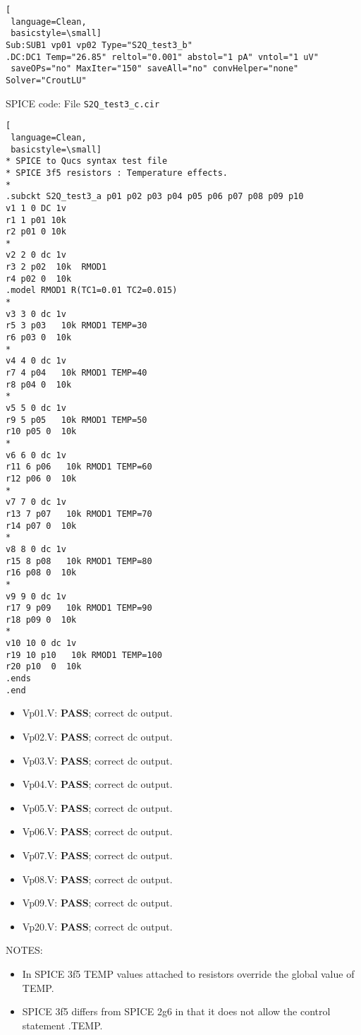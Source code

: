 \begin{flushleft}
\begin{flushleft}
\begin{lstlisting}[
 language=Clean, 
 basicstyle=\small]
Sub:SUB1 vp01 vp02 Type="S2Q_test3_b"
.DC:DC1 Temp="26.85" reltol="0.001" abstol="1 pA" vntol="1 uV"
 saveOPs="no" MaxIter="150" saveAll="no" convHelper="none" Solver="CroutLU"

\end{lstlisting}
\end{flushleft}



SPICE code: File \verb|S2Q_test3_c.cir|
\begin{lstlisting}[
 language=Clean, 
 basicstyle=\small]
* SPICE to Qucs syntax test file 
* SPICE 3f5 resistors : Temperature effects.
*
.subckt S2Q_test3_a p01 p02 p03 p04 p05 p06 p07 p08 p09 p10
v1 1 0 DC 1v
r1 1 p01 10k
r2 p01 0 10k
*
v2 2 0 dc 1v
r3 2 p02  10k  RMOD1 
r4 p02 0  10k
.model RMOD1 R(TC1=0.01 TC2=0.015)
*
v3 3 0 dc 1v
r5 3 p03   10k RMOD1 TEMP=30
r6 p03 0  10k
*
v4 4 0 dc 1v
r7 4 p04   10k RMOD1 TEMP=40
r8 p04 0  10k
*
v5 5 0 dc 1v
r9 5 p05   10k RMOD1 TEMP=50
r10 p05 0  10k
*
v6 6 0 dc 1v
r11 6 p06   10k RMOD1 TEMP=60
r12 p06 0  10k
*
v7 7 0 dc 1v
r13 7 p07   10k RMOD1 TEMP=70
r14 p07 0  10k
*
v8 8 0 dc 1v
r15 8 p08   10k RMOD1 TEMP=80
r16 p08 0  10k
*
v9 9 0 dc 1v
r17 9 p09   10k RMOD1 TEMP=90
r18 p09 0  10k
*
v10 10 0 dc 1v
r19 10 p10   10k RMOD1 TEMP=100
r20 p10  0  10k
.ends
.end

\end{lstlisting}
\end{flushleft}

\begin{flushleft}

\begin{itemize}
 \item Vp01.V: \textbf{PASS}; correct dc output.
 \item Vp02.V: \textbf{PASS}; correct dc output.
 \item Vp03.V: \textbf{PASS}; correct dc output.
 \item Vp04.V: \textbf{PASS}; correct dc output.
 \item Vp05.V: \textbf{PASS}; correct dc output.
 \item Vp06.V: \textbf{PASS}; correct dc output.
 \item Vp07.V: \textbf{PASS}; correct dc output.
 \item Vp08.V: \textbf{PASS}; correct dc output.
 \item Vp09.V: \textbf{PASS}; correct dc output.
 \item Vp20.V: \textbf{PASS}; correct dc output. 
\end{itemize}

NOTES: \begin{itemize}
\item In SPICE 3f5 TEMP values attached to resistors override the global value of TEMP.                                                     
\item SPICE 3f5 differs from SPICE 2g6 in that it does not allow the control statement .TEMP.

                                  \end{itemize}

\end{flushleft}

